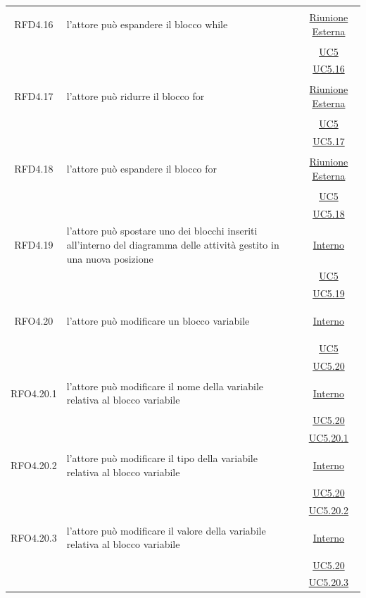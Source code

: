 \begin{itemize}
\begin{itemize}
\begin{itemize}
\begin{itemize}
\begin{longtable}{|c|>{\centering}m{7cm}|c|}
\hypertarget{RFD4.16}{RFD4.16} & l'attore può espandere il blocco while & \hyperlink{Riunione Esterna}{Riunione Esterna}\\
& &\hyperref[UC5]{UC5}\\
& &\hyperref[UC5.16]{UC5.16}\\ \hline

\hypertarget{RFD4.17}{RFD4.17} & l'attore può ridurre il blocco for & \hyperlink{Riunione Esterna}{Riunione Esterna}\\
& &\hyperref[UC5]{UC5}\\
& & \hyperref[UC5.17]{UC5.17}\\ \hline

\hypertarget{RFD4.18}{RFD4.18} & l'attore può espandere il blocco for &  \hyperlink{Riunione Esterna}{Riunione Esterna}\\
& &\hyperref[UC5]{UC5}\\
& &\hyperref[UC5.18]{UC5.18}\\ \hline

\hypertarget{RFD4.19}{RFD4.19} & l'attore può spostare uno dei blocchi inseriti all'interno del diagramma delle attività gestito in una nuova posizione &  \hyperlink{Interno}{Interno}\\
& &\hyperref[UC5]{UC5}\\
& &\hyperref[UC5.19]{UC5.19}\\ \hline

\hypertarget{RFO4.20}{RFO4.20} & l'attore può modificare un blocco variabile &  \hyperlink{Interno}{Interno}\\
& &\hyperref[UC5]{UC5}\\
& &\hyperref[UC5.20]{UC5.20}\\ \hline

\hypertarget{RFO4.20.1}{RFO4.20.1} & l'attore può modificare il nome della variabile relativa al blocco variabile &  \hyperlink{Interno}{Interno}\\
& &\hyperref[UC5.20]{UC5.20}\\
& &\hyperref[UC5.20.1]{UC5.20.1}\\ \hline

\hypertarget{RFO4.20.2}{RFO4.20.2} & l'attore può modificare il tipo della variabile relativa al blocco variabile &  \hyperlink{Interno}{Interno}\\
& &\hyperref[UC5.20]{UC5.20}\\
& &\hyperref[UC5.20.2]{UC5.20.2}\\ \hline

\hypertarget{RFO4.20.3}{RFO4.20.3} & l'attore può modificare il valore della variabile relativa al blocco variabile &  \hyperlink{Interno}{Interno}\\
& &\hyperref[UC5.20]{UC5.20}\\
& &\hyperref[UC5.20.3]{UC5.20.3}\\ \hline


\end{longtable}
\end{itemize}
\end{itemize}
\end{itemize}
\end{itemize}
